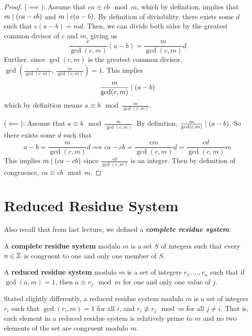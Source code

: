 \begin{proof}

    ($\implies$):
    Assume that $ca \equiv cb \mod m$, which by definition, implies that $m \mathrel{\mid} (ca-cb)$ and $m \mathrel{\mid} c(a-b)$. By definition of divisibility, there exists some $d$ such that $c(a-b) = md$. Then, we can divide both sides by the greatest common divisor of $c$ and $m$, giving us
    $$
    \frac{c}{\gcd(c,m)} (a-b) = \frac{m}{\gcd(c,m)} d
    $$
    Further, since $\gcd(c,m)$ is the greatest common divisor, $\gcd\left(\frac{c}{\gcd(c,m)},\, \frac{m}{\gcd(c,m)} \right) = 1$. This implies
    $$
    \frac{m}{\gcd(c,m)} \mathrel{\mid} (a-b)
    $$
    which by definition means $a \equiv b \mod \frac{m}{\gcd(c,m)}$.

    ($\impliedby$): Assume that $a \equiv b \mod \frac{m}{\gcd(c,m)}$. By definition, $\frac{m}{\gcd(c,m)} \mathrel{\mid} (a-b)$. So there exists some $d$ such that
    $$
    a-b = \frac{m}{\gcd(c,m)}d \implies ca - cb = \frac{cm}{\gcd(c,m)} d = \frac{cd}{\gcd(c,m)} m
    $$
    This implies $m \mathrel{\mid} (ca-cb)$ since $\frac{cd}{\gcd(c,m)}$ is an integer. Then by definition of congruence, $ca \equiv cb \mod m$.
\end{proof}

\section{Reduced Residue System}

Also recall that from last lecture, we defined a \textit{\textbf{complete residue system}}.

\begin{definition}
    A \textbf{complete residue system} modulo $m$ is a set $S$ of integers such that every $n \in \mathbb{Z}$ is congruent to one and only one member of $S$.
\end{definition}

\begin{definition}
    A \textbf{reduced residue system} modulo $m$ is a set of integers $r_1, \ldots, r_n$ such that if $\gcd(a,m) = 1$, then $a \equiv r_j \mod m$ for one and only one value of $j$.
\end{definition}

Stated slightly differently, a reduced residue system modulo $m$ is a set of integers $r_i$ such that $\gcd(r_i,m) = 1$ for all $i$, and $r_i \not\equiv r_j \mod m$ for all $j \neq i$. That is, each element in a reduced residue system is relatively prime to $m$ and no two elements of the set are congruent modulo $m$.

